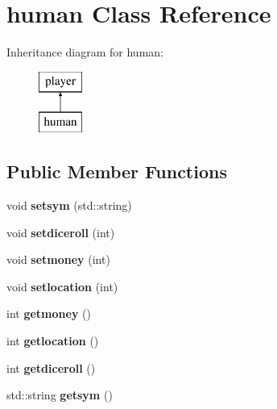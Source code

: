 \hypertarget{classhuman}{}\section{human Class Reference}
\label{classhuman}
Inheritance diagram for human\+:\begin{figure}[H]
\begin{center}
\leavevmode
\includegraphics[height=2.000000cm]{classhuman}
\end{center}
\end{figure}
\subsection*{Public Member Functions}
\begin{DoxyCompactItemize}
\item 
\mbox{\label{classhuman_a14907a502d24faf9c59e8efebbba3b57}} 
void {\bfseries setsym} (std\+::string)
\item 
\mbox{\label{classhuman_ab3d8fb07f243f0528720194cad0876ce}} 
void {\bfseries setdiceroll} (int)
\item 
\mbox{\label{classhuman_ae3320b512228d32e1d5f81e215939746}} 
void {\bfseries setmoney} (int)
\item 
\mbox{\label{classhuman_a03120180c672b2773487da0bae5b8f9e}} 
void {\bfseries setlocation} (int)
\item 
\mbox{\label{classhuman_a917a1a68e64999364d2cc24ecf35ea0c}} 
int {\bfseries getmoney} ()
\item 
\mbox{\label{classhuman_ace85172aa519167477e164d9d160327b}} 
int {\bfseries getlocation} ()
\item 
\mbox{\label{classhuman_a4c3476a5985c192972059c347403bebf}} 
int {\bfseries getdiceroll} ()
\item 
\mbox{\label{classhuman_ab6ae6e1835e22c7a23c7b4560f288037}} 
std\+::string {\bfseries getsym} ()
\end{DoxyCompactItemize}
